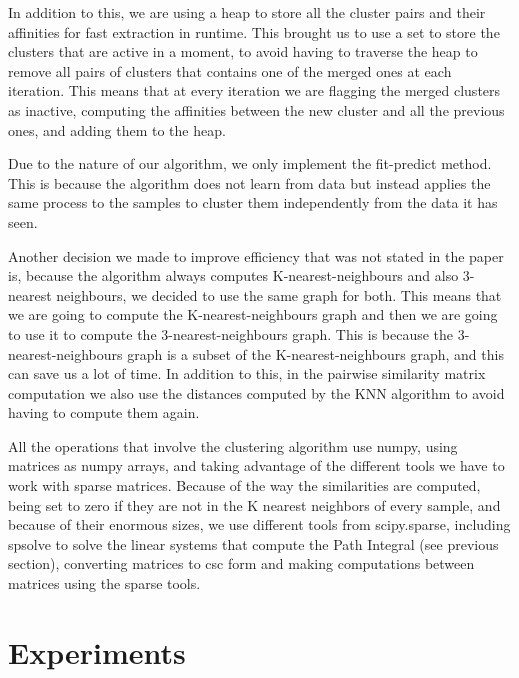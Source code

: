 \documentclass[
	10pt,
	parskip=half-,	
	paper=a4,
	english
	]{scrartcl}
\begin{document}
In addition to this, we are using a heap to store all the cluster pairs and their affinities for fast extraction in runtime. This brought us to use a set to store the clusters that are active in a moment, to avoid having to traverse the heap to remove all pairs of clusters that contains one of the merged ones at each iteration. This means that at every iteration we are flagging the merged clusters as inactive, computing the affinities between the new cluster and all the previous ones, and adding them to the heap.

Due to the nature of our algorithm, we only implement the fit-predict method. This is because the algorithm does not learn from data but instead applies the same process to the samples to cluster them independently from the data it has seen.

Another decision we made to improve efficiency that was not stated in the paper is, because the algorithm always computes K-nearest-neighbours and also 3-nearest neighbours, we decided to use the same graph for both. This means that we are going to compute the K-nearest-neighbours graph and then we are going to use it to compute the 3-nearest-neighbours graph. This is because the 3-nearest-neighbours graph is a subset of the K-nearest-neighbours graph, and this can save us a lot of time. In addition to this, in the pairwise similarity matrix computation we also use the distances computed by the KNN algorithm to avoid having to compute them again.

All the operations that involve the clustering algorithm use numpy, using matrices as numpy arrays, and taking advantage of the different tools we have to work with sparse matrices. Because of the way the similarities are computed, being set to zero if they are not in the K nearest neighbors of every sample, and because of their enormous sizes, we use different tools from scipy.sparse, including spsolve to solve the linear systems that compute the Path Integral (see previous section), converting matrices to csc form and making computations between matrices using the sparse tools.

\section {Experiments}
\end{document}

